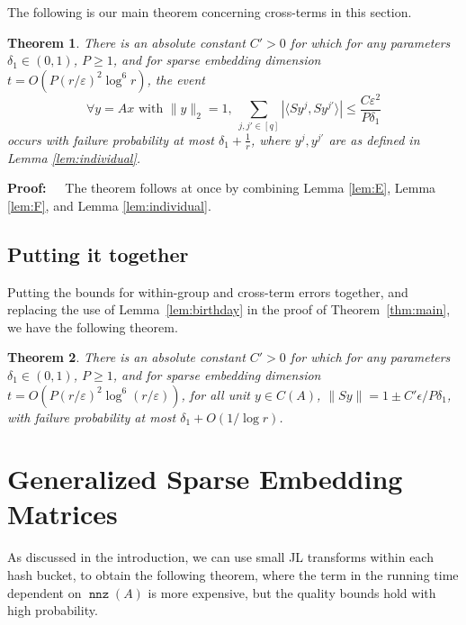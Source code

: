 \documentclass{sig-alternate}
\newcommand{\norm}[1]{{\| #1 \|}}
\DeclareMathOperator{\nnz}{\mathtt{nnz}}
\newcommand{\eps}{\varepsilon}
\newtheorem{theorem}{Theorem}
\def\FullBox{\hbox{\vrule width 8pt height 8pt depth 0pt}}
\def\qed{\ifmmode\qquad\FullBox\else{\unskip\nobreak\hfil
\penalty50\hskip1em\null\nobreak\hfil\FullBox
\parfillskip=0pt\finalhyphendemerits=0\endgraf}\fi}
\newenvironment{proof}{\begin{trivlist} \item {\bf Proof:~~}}
  {\qed\end{trivlist}}
\begin{document}
The following is our main theorem concerning cross-terms in this section.
\begin{theorem}\label{thm:partition cross}
There is an absolute constant $C' > 0$ for which 
for any parameters $\delta_1 \in (0,1)$, $P \geq 1$, and for sparse embedding dimension 
$t = O(P (r/\eps)^2 \log^6 r)$, the event
\[\forall y = Ax \textrm{ with } \|y\|_2 = 1, 
\ \sum_{j, j' \in [q]} |\langle Sy^j, Sy^{j'} \rangle | \leq \frac{C\eps^2}{P \delta_1}
\]
occurs with failure probability at most $\delta_1 + \frac{1}{r}$,
where $y^j, y^{j'}$ are as defined in Lemma \ref{lem:individual}.
\end{theorem}
\begin{proof}
The theorem follows at once by combining Lemma \ref{lem:E}, Lemma \ref{lem:F}, and Lemma \ref{lem:individual}.
\end{proof}

\subsection{Putting it together}

Putting the bounds for within-group and cross-term errors together, and replacing
the use of Lemma~\ref{lem:birthday} in the proof of Theorem~\ref{thm:main},
we have the following theorem.

\fi 

\begin{theorem}\label{thm:partition main}
There is an absolute constant $C' > 0$ for which 
for any parameters $\delta_1 \in (0,1)$, $P \geq 1$, and for sparse embedding dimension 
$t = O(P (r/\eps)^2 \log^6 (r/\eps))$, for all unit $y\in C(A)$,
$\norm{Sy} = 1 \pm C'\epsilon/P\delta_1$,
with failure probability at most $\delta_1 + O(1/\log r)$.
\end{theorem}

\section{Generalized Sparse Embedding Matrices}\label{sec:generalized}

\ifSTOC
As discussed in the introduction, we can use small JL transforms within each hash bucket,
to obtain the following theorem, where the term in the running time
dependent on $\nnz(A)$ is more expensive, but the quality bounds hold with high probability.
\else
\end{document}

